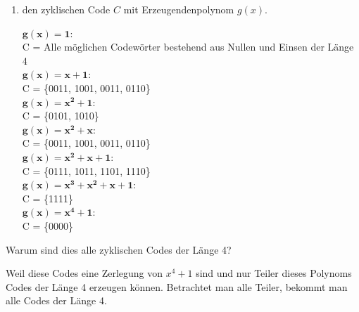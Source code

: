 \documentclass{article} %
\begin{document}
\begin{enumerate}
\begin{mybox}
    \end{mybox}
    \item den zyklischen Code $C$ mit Erzeugendenpolynom $g(x)$.
    \begin{mybox}
    $\mathbf{g(x) = 1}$: \\
    C = Alle möglichen Codewörter bestehend aus Nullen und Einsen der Länge 4\\
    $\mathbf{g(x) = x+1}$:\\
    C = \{0011, 1001, 0011, 0110\} \\
     $\mathbf{g(x) = x^2+1}$: \\
    C = \{0101, 1010\} \\
     $\mathbf{g(x) = x^2+x}$:\\
    C = \{0011, 1001, 0011, 0110\} \\
     $\mathbf{g(x) = x^2+x+1}$:\\
    C = \{0111, 1011, 1101, 1110\} \\
    $\mathbf{g(x) = x^3 + x^2 + x + 1}$:\\
    C = \{1111\} \\
    $\mathbf{g(x) = x^4+1}$:\\
    C = \{0000\} \\
    \end{mybox}
\end{enumerate}
Warum sind dies alle zyklischen Codes der Länge 4?
\begin{mybox}
 Weil diese Codes eine Zerlegung von $x^4+1$ sind und nur Teiler dieses Polynoms Codes der Länge 4 erzeugen können. Betrachtet man alle Teiler, bekommt man alle Codes der Länge 4. 
\end{mybox}
\end{document}
